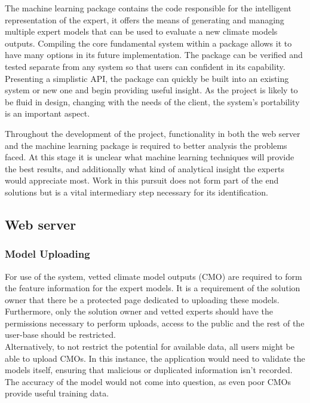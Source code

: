 \documentclass{ecmm427_assignment}
\begin{document}
The machine learning package contains the code responsible for the intelligent representation of the expert, it offers the means of generating and managing multiple expert models that can be used to evaluate a new climate models outputs. Compiling the core fundamental system within a package allows it to have many options in its future implementation. The package can be verified and tested separate from any system so that users can confident in its capability. Presenting a simplistic API, the package can quickly be built into an existing system or new one and begin providing useful insight. As the project is likely to be fluid in design, changing with the needs of the client, the system's portability is an important aspect.

Throughout the development of the project, functionality in both the web server and the machine learning package is required to better analysis the problems faced. At this stage it is unclear what machine learning techniques will provide the best results, and additionally what kind of analytical insight the experts would appreciate most. Work in this pursuit does not form part of the end solutions but is a vital intermediary step necessary for its identification.

\subsection{Web server}

\subsubsection{Model Uploading}

For use of the system, vetted climate model outputs (CMO) are required to form the feature information for the expert models. It is a requirement of the solution owner that there be a protected page dedicated to uploading these models. Furthermore, only the solution owner and vetted experts should have the permissions necessary to perform uploads, access to the public and the rest of the user-base should be restricted.\\

\noindent Alternatively, to not restrict the potential for available data, all users might be able to upload CMOs. In this instance, the application would need to validate the models itself, ensuring that malicious or duplicated information isn't recorded. The accuracy of the model would not come into question, as even poor CMOs provide useful training data.
\end{document}
